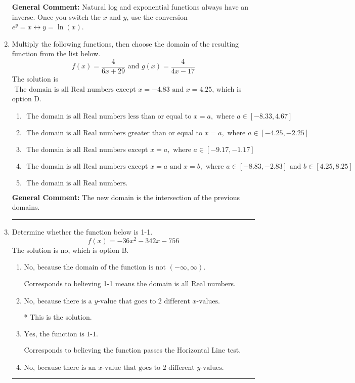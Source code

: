 \documentclass{extbook}[14pt]
\newcommand{\litem}[1]{\item #1

\rule{\textwidth}{0.4pt}}
\begin{document}
\begin{enumerate}
{\textbf{General Comment:} Natural log and exponential functions always have an inverse. Once you switch the $x$ and $y$, use the conversion $ e^y = x \leftrightarrow y=\ln(x)$.
}
\litem{
Multiply the following functions, then choose the domain of the resulting function from the list below.
\[ f(x) = \frac{4}{6x+29} \text{ and } g(x) = \frac{4}{4x-17} \]The solution is \( \text{ The domain is all Real numbers except } x = -4.83 \text{ and } x = 4.25 \), which is option D.\begin{enumerate}[label=\Alph*.]
\item \( \text{ The domain is all Real numbers less than or equal to } x = a, \text{ where } a \in [-8.33, 4.67] \)


\item \( \text{ The domain is all Real numbers greater than or equal to } x = a, \text{ where } a \in [-4.25, -2.25] \)


\item \( \text{ The domain is all Real numbers except } x = a, \text{ where } a \in [-9.17, -1.17] \)


\item \( \text{ The domain is all Real numbers except } x = a \text{ and } x = b, \text{ where } a \in [-8.83, -2.83] \text{ and } b \in [4.25, 8.25] \)


\item \( \text{ The domain is all Real numbers. } \)


\end{enumerate}

\textbf{General Comment:} The new domain is the intersection of the previous domains.
}
\litem{
Determine whether the function below is 1-1.
\[ f(x) = -36 x^2 - 342 x - 756 \]The solution is \( \text{no} \), which is option B.\begin{enumerate}[label=\Alph*.]
\item \( \text{No, because the domain of the function is not $(-\infty, \infty)$.} \)

Corresponds to believing 1-1 means the domain is all Real numbers.
\item \( \text{No, because there is a $y$-value that goes to 2 different $x$-values.} \)

* This is the solution.
\item \( \text{Yes, the function is 1-1.} \)

Corresponds to believing the function passes the Horizontal Line test.
\item \( \text{No, because there is an $x$-value that goes to 2 different $y$-values.} \)


\end{enumerate}}
\end{enumerate}
\end{document}
